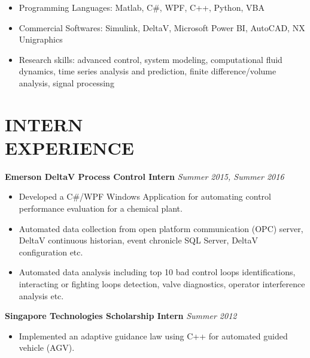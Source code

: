 \documentclass[margin, 9pt]{res} %
\begin{document}
\begin{resume}
\vspace*{-2pt}
\begin{itemize}[leftmargin=*] \itemsep -4pt
	\item Programming Languages: Matlab, C\#, WPF,  C++, Python, VBA
	\item Commercial Softwares: Simulink, DeltaV, Microsoft Power BI, AutoCAD, NX Unigraphics 
	\item Research skills: advanced control, system modeling, computational fluid dynamics, time series analysis and prediction, finite difference/volume analysis, signal processing
\end{itemize}


\section{INTERN\\ EXPERIENCE}

{\textbf{Emerson DeltaV Process Control Intern}} \hfill\textit{Summer 2015, Summer 2016}\\
\vspace*{-10pt}
\begin{itemize}[leftmargin=*] \itemsep -3pt
\vspace*{-5pt}
	\item Developed a C\#/WPF Windows Application for automating control performance evaluation for a chemical plant.
    \item Automated data collection from open platform communication (OPC) server, DeltaV continuous historian, event chronicle SQL Server,  DeltaV configuration etc.
	\item Automated data analysis including  top 10 bad control loops identifications, interacting or fighting  loops detection, valve diagnostics, operator interference analysis etc.
\end{itemize}

\medskip
{\textbf{Singapore Technologies Scholarship Intern}} \hfill\textit{Summer 2012}\\
\vspace*{-10pt}
\begin{itemize}[leftmargin=*] \itemsep -3pt
\vspace*{-5pt}
	\item Implemented an adaptive guidance law using C++ for automated guided vehicle (AGV).
\end{itemize}


\end{resume}
\end{document}
